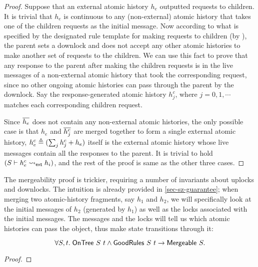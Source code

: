 \documentclass[sigplan,10pt,review,anonymous,screen]{acmart}\settopmatter{printfolios=true,printccs=false,printacmref=false}
\begin{document}
\begin{proof}
  Suppose that an external atomic history $h_e$ outputted requests to children.
  It is trivial that $h_e$ is continuous to any (non-external) atomic history that takes one of the children requests as the initial message.
  Now according to what is specified by the designated rule template for making requests to children (by ), the parent sets a downlock and does not accept any other atomic histories to make another set of requests to the children.
  We can use this fact to prove that any response to the parent after making the children requests is in the live messages of a non-external atomic history that took the corresponding request, since no other ongoing atomic histories can pass through the parent by the downlock.
  Say the response-generated atomic history $h^c_j$, where $j=0,1,\cdots$ matches each corresponding children request.

  Since $\overline{h_e}$ does not contain any non-external atomic histories, the only possible case is that $h_e$ and $\overline{h^c_j}$ are merged together to form a single external atomic history, \ie{} $h^c_e \triangleq (\sum_j h^c_j + h_e)$ itself is the external atomic history whose live messages contain all the responses to the parent.
  It is trivial to hold $(S \vdash h^c_e \leadsto_{\textsf{ext}} h_i)$, and the rest of the proof is same as the other three cases.
\end{proof}
\renewcommand*{\proofname}{Proof}

The mergeability proof is trickier, requiring a number of invariants about uplocks and downlocks.
The intuition is already provided in \autoref{sec-sz-guarantee}; when merging two atomic-history fragments, say $h_1$ and $h_2$, we will specifically look at the initial messages of $h_2$ (generated by $h_1$) as well as the locks associated with the initial messages.
The messages and the locks will tell us which atomic histories can pass the object, thus make state transitions through it:
\renewcommand*{\proofname}{Proof Sketch}
\begin{theorem}
  \begin{displaymath}
    \forall S, t.\; \mathsf{OnTree}\ S\ t \land \mathsf{GoodRules}\ S\ t \to \mathsf{Mergeable}\ S.
  \end{displaymath}
\end{theorem}
\begin{proof}
\end{proof}
\renewcommand*{\proofname}{Proof}

\end{document}
